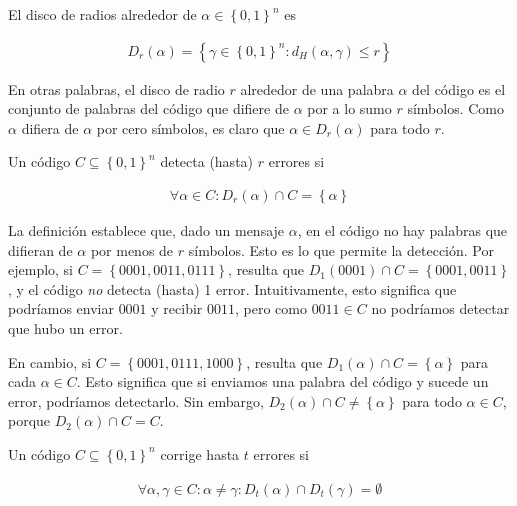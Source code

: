 \documentclass[a4paper]{article}
\begin{document}
\begin{definition}[Disco]
    El disco de radios alrededor de $\alpha \in \left\{ 0, 1 \right\}^n $ es 

    \begin{align*}
        D_r(\alpha) = \left\{ \gamma \in \left\{ 0, 1 \right\}^n : d_H(\alpha, \gamma) \leq r  \right\} 
    \end{align*}
\end{definition}

En otras palabras, el disco de radio $r$ alrededor de una palabra $\alpha$ del
código es el conjunto de palabras del código que difiere de $\alpha$ por a lo
sumo $r$ símbolos. Como $\alpha$ difiera de $\alpha$ por cero símbolos, es
claro que $\alpha \in D_r(\alpha)$ para todo $r$.

\begin{definition}[Detección]
    Un código $C \subseteq \left\{ 0, 1 \right\}^n $ detecta (hasta) $r$ errores si 

    \begin{align*}
        \forall \alpha \in C : D_r(\alpha) \cap C = \left\{ \alpha \right\} 
    \end{align*}
\end{definition}

La definición establece que, dado un mensaje $\alpha$, en el código no hay
palabras que difieran de $\alpha$ por menos de $r$ símbolos. Esto
es lo que permite la detección. Por ejemplo, si $C = \left\{ 0001, 0011, 0111
\right\} $, resulta que $D_1(0001) \cap C = \left\{ 0001, 0011 \right\} $, y el
código \textit{no} detecta (hasta) 1 error. Intuitivamente, esto significa que
podríamos enviar $0001$ y recibir $0011$, pero como $0011 \in C$ no podríamos
detectar que hubo un error.

En cambio, si $C = \left\{ 0001, 0111, 1000 \right\} $, resulta que
$D_1(\alpha) \cap C = \left\{ \alpha \right\} $ para cada $\alpha \in C$. Esto
significa que si enviamos una palabra del código y sucede un error, podríamos
detectarlo. Sin embargo, $D_2(\alpha) \cap C \neq \left\{ \alpha \right\} $
para todo $\alpha \in C$, porque $D_2(\alpha) \cap C = C$.


\begin{definition}[Corrección]
    Un código $C \subseteq \left\{ 0, 1 \right\}^{n} $ corrige hasta $t$ errores si 

    \begin{align*}
        \forall \alpha, \gamma \in C : \alpha \neq \gamma : D_t(\alpha) \cap D_t(\gamma) = \emptyset
    \end{align*}
\end{definition}
\end{document}
